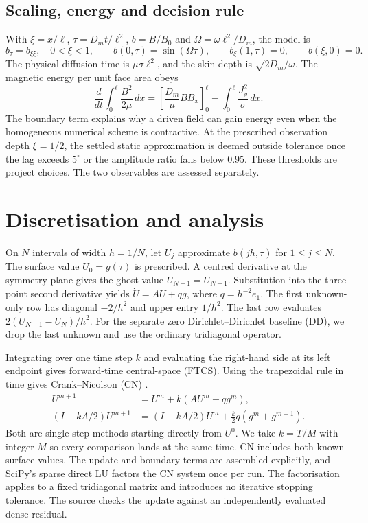 \documentclass[11pt,a4paper]{article}
\newcommand{\degree}{^{\circ}}
\begin{document}
\subsection{Scaling, energy and decision rule}
With $\xi=x/\ell$, $\tau=D_mt/\ell^2$, $b=B/B_0$ and $\Omega=\omega\ell^2/D_m$, the model is
\begin{equation}\label{eq:ibvp}
b_\tau=b_{\xi\xi},\quad 0<\xi<1,\qquad b(0,\tau)=\sin(\Omega\tau),\qquad
b_\xi(1,\tau)=0,\qquad b(\xi,0)=0.
\end{equation}
The physical diffusion time is $\mu\sigma\ell^2$, and the skin depth is $\sqrt{2D_m/\omega}$. The magnetic energy per unit face area obeys
\begin{equation}
\frac{d}{dt}\int_0^\ell \frac{B^2}{2\mu}\,dx=
\left[\frac{D_m}{\mu}BB_x\right]_0^\ell-\int_0^\ell\frac{J_y^2}{\sigma}\,dx.
\end{equation}
The boundary term explains why a driven field can gain energy even when the homogeneous numerical scheme is contractive. At the prescribed observation depth $\xi=1/2$, the settled static approximation is deemed outside tolerance once the lag exceeds $5\degree$ or the amplitude ratio falls below $0.95$. These thresholds are project choices. The two observables are assessed separately.

\clearpage
\section{Discretisation and analysis}
On $N$ intervals of width $h=1/N$, let $U_j$ approximate $b(jh,\tau)$ for $1\leq j\leq N$. The surface value $U_0=g(\tau)$ is prescribed. A centred derivative at the symmetry plane gives the ghost value $U_{N+1}=U_{N-1}$. Substitution into the three-point second derivative yields $\dot U=AU+qg$, where $q=h^{-2}e_1$. The first unknown-only row has diagonal $-2/h^2$ and upper entry $1/h^2$. The last row evaluates $2(U_{N-1}-U_N)/h^2$. For the separate zero Dirichlet--Dirichlet baseline (DD), we drop the last unknown and use the ordinary tridiagonal operator.

Integrating over one time step $k$ and evaluating the right-hand side at its left endpoint gives forward-time central-space (FTCS). Using the trapezoidal rule in time gives Crank--Nicolson (CN) \cite{leveque,cn}.
\begin{align}
U^{m+1}&=U^m+k(AU^m+qg^m),\\
(I-kA/2)U^{m+1}&=(I+kA/2)U^m+\tfrac{k}{2}q(g^m+g^{m+1}).
\end{align}
Both are single-step methods starting directly from $U^0$. We take $k=T/M$ with integer $M$ so every comparison lands at the same time. CN includes both known surface values. The update and boundary terms are assembled explicitly, and SciPy's sparse direct LU factors the CN system once per run. The factorisation applies to a fixed tridiagonal matrix and introduces no iterative stopping tolerance. The source checks the update against an independently evaluated dense residual.
\end{document}
